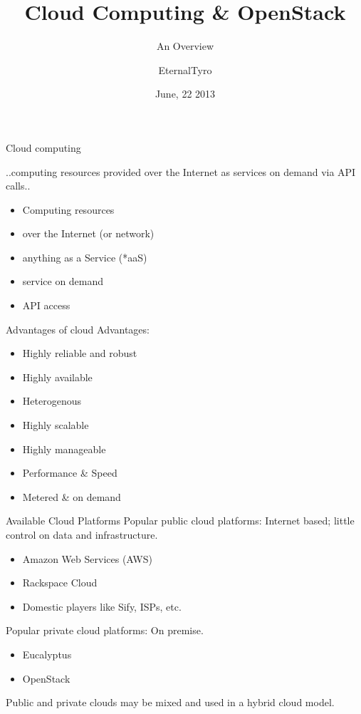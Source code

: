 \documentclass{beamer}
\title[Cloud Computing]{Cloud Computing \& OpenStack}
\subtitle[Overview]{An Overview}
\author[EternalTyro]{EternalTyro}
\institute[A]{
      Dummy Company\\
      Dummy workshop\\[1ex]
      \texttt{http://dummydummy.com}
}
\date{June, 22 2013}
\begin{document}
\begin{frame}[plain]
  \titlepage
\end{frame}

\begin{frame}{Cloud computing}

\begin{definition}
 ..computing resources provided over the Internet as services on demand via API calls..
\end{definition}
\pause

\begin{itemize}
 \item Computing resources
 \pause
 \item over the Internet (or network)
 \pause
 \item anything as a Service (*aaS)
 \pause
 \item service on demand
 \pause
 \item API access
\end{itemize}
\end{frame}

\begin{frame}{Advantages of cloud}
Advantages:
\begin{itemize}
 \item Highly reliable and robust
 \pause
 \item Highly available
 \pause
 \item Heterogenous
 \pause
 \item Highly scalable
 \pause
 \item Highly manageable
 \pause
 \item Performance \& Speed
 \pause
 \item Metered \& on demand
\end{itemize}
\end{frame}


\begin{frame}{Available Cloud Platforms}
Popular public cloud platforms: Internet based; little control on data and infrastructure.
\begin{itemize}
 \item Amazon Web Services (AWS)
 \item Rackspace Cloud
 \item Domestic players like Sify, ISPs, etc.
\end{itemize}
\pause
Popular private cloud platforms: On premise.
\begin{itemize}
 \item Eucalyptus
 \item OpenStack
\end{itemize}
\pause
Public and private clouds may be mixed and used in a hybrid cloud model.
\end{frame}
\end{document}
